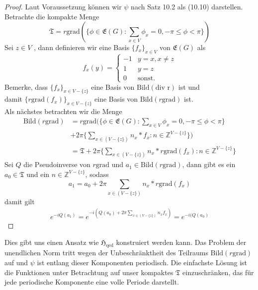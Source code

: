 \documentclass[11pt,a4paper,leqno]{report}
\numberwithin{equation}{chapter}
\begin{document}
\begin{proof} Laut Voraussetzung k\"onnen wir $\psi$ nach Satz 10.2 als (10.10) darstellen.
Betrachte die kompakte Menge
	\begin{equation}
		\mathfrak{T} = r\text{grad}(\{\phi\in\mathfrak{E}(G):\sum_{x\in V}\phi_x=0, -\pi\leq\phi<\pi\})
	\end{equation}
Sei $z \in V$ , dann definieren wir eine Basis $\{f_x\}_{x\in V}$ von $\mathfrak{E}(G)$ als
\begin{equation}
	f_x(y)=\begin{cases} 
		-1 & y=x, x\neq z \\
		1 & y=z \\
		0 & \text{sonst. } 
	\end{cases}
\end{equation}
Bemerke, dass $\{f_x\}_{x\in V-\{z\}}$ eine Basis von $\text{Bild}(\text{div r})$ ist und \\damit $\{r\text{grad}(f_x)\}_{x\in V-\{z\}}$ eine Basis von $\text{Bild}(r\text{grad})$ ist.\\
Als n\"achstes betrachten wir die Menge
\begin{align*}
\text{Bild}(r\text{grad}) &= r\text{grad}(\{\phi\in\mathfrak{E}(G):\sum_{x\in V}\phi_x=0, -\pi\leq\phi<\pi\} \\&+ 2\pi\{\sum_{x\in(V-\{z\})}n_x*f_x: n\in \mathbb{Z}^{V-\{z\}}\})\\
&=\mathfrak{T} + 2\pi\{\sum_{x\in(V-\{z\})}n_x*r\text{grad}(f_x): n\in \mathbb{Z}^{V-\{z\}}\}
\end{align*}
Sei $Q$ die Pseudoinverse von $r\text{grad}$ und $a_1\in\text{Bild}(r\text{grad})$, dann gibt es ein $a_0\in \mathfrak{T}$ und ein $n\in \mathbb{Z}^{V-\{z\}}$, sodass
\begin{equation}
	a_1 = a_0 + 2\pi \sum_{x\in(V-\{z\})}n_x*r\text{grad}(f_x)
\end{equation}
damit gilt
\begin{align*}
	e^{-iQ(a_1)}=e^{-i(Q(a_0) + 2\pi \sum_{x\in(V-\{z\})}n_xf_x)}=e^{-i(Q(a_0)}
\end{align*}

\end{proof}
\noindent
Dies gibt uns einen Ansatz wie $\mathfrak{H}_{\text{qed}}$ konstruiert werden kann. Das Problem der unendlichen Norm tritt wegen der Unbeschränktheit des Teilraums $\text{Bild}(r\text{grad})$ auf und $\psi$ ist entlang dieser Komponenten periodisch. Die einfachste L\"osung ist die Funktionen unter Betrachtung auf unser kompaktes $\mathfrak{T}$ einzuschränken, das f\"ur jede periodische Komponente eine volle Periode darstellt.\\
\end{document}
